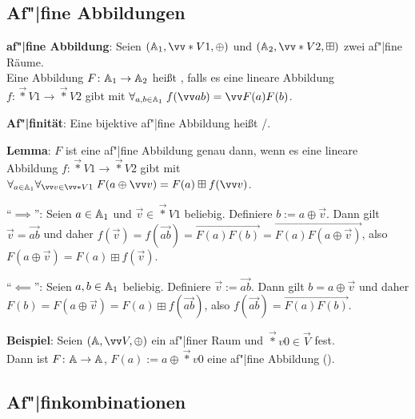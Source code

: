 \pagebreak

\subsection{%
    Af"|fine Abbildungen%
}

\textbf{af"|fine Abbildung}:
Seien $(\AA_1, \vec*{V}{1}, \oplus)$ und $(\AA_2, \vec*{V}{2}, \boxplus)$ zwei af"|fine Räume.\\
Eine Abbildung $F\colon \AA_1 \to \AA_2$ heißt , falls
es eine lineare Abbildung $f\colon \vec*{V}{1} \to \vec*{V}{2}$ gibt mit
$\forall_{a, b \in \AA_1}\; f(\vec{ab}) = \vec{F(a)F(b)}$.

\textbf{Af"|finität}:
Eine bijektive af"|fine Abbildung heißt /.

\linie

\textbf{Lemma}:
$F$ ist eine af"|fine Abbildung genau dann, wenn es eine
lineare Abbildung $f\colon \vec*{V}{1} \to \vec*{V}{2}$ gibt mit
$\forall_{a \in \AA_1} \forall_{\vec{v} \in \vec*{V}{1}}\;
F(a \oplus \vec{v}) = F(a) \boxplus f(\vec{v})$.

\begin{Beweis}
    "`$\implies$"':
    Seien $a \in \AA_1$ und $\vec{v} \in \vec*{V}{1}$ beliebig.
    Definiere $b := a \oplus \vec{v}$.
    Dann gilt $\vec{v} = \vec{ab}$ und daher
    $f(\vec{v}) = f(\vec{ab}) = \vec{F(a)F(b)} = \vec{F(a) F(a \oplus \vec{v})}$,
    also $F(a \oplus \vec{v}) = F(a) \boxplus f(\vec{v})$.
    
    "`$\impliedby$"':
    Seien $a, b \in \AA_1$ beliebig.
    Definiere $\vec{v} := \vec{ab}$.
    Dann gilt $b = a \oplus \vec{v}$ und daher\\
    $F(b) = F(a \oplus \vec{v}) = F(a) \boxplus f(\vec{ab})$,
    also $f(\vec{ab}) = \vec{F(a)F(b)}$.
\end{Beweis}

\linie

\textbf{Beispiel}:
Seien $(\AA, \vec{V}, \oplus)$ ein af"|finer Raum und $\vec*{v}{0} \in \vec{V}$ fest.\\
Dann ist $F\colon \AA \to \AA$, $F(a) := a \oplus \vec*{v}{0}$
eine af"|fine Abbildung ().

\subsection{%
    Af"|finkombinationen%
}

